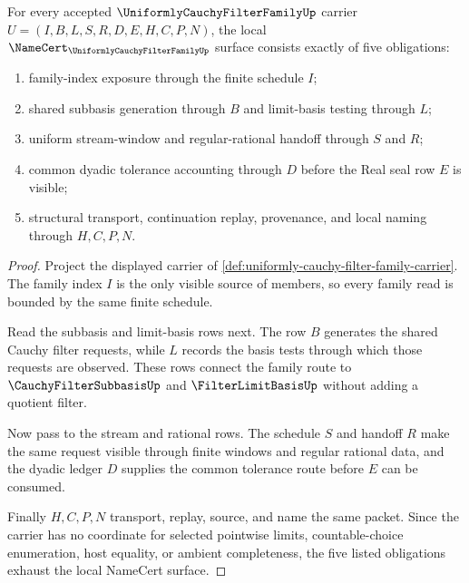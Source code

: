 \begin{theorem}
\label{thm:uniformly-cauchy-filter-family-obligations}
For every accepted $\UniformlyCauchyFilterFamilyUp$ carrier $U=(I,B,L,S,R,D,E,H,C,P,N)$, the local $\NameCert_{\UniformlyCauchyFilterFamilyUp}$ surface consists exactly of five obligations:
\begin{enumerate}
\item family-index exposure through the finite schedule $I$;
\item shared subbasis generation through $B$ and limit-basis testing through $L$;
\item uniform stream-window and regular-rational handoff through $S$ and $R$;
\item common dyadic tolerance accounting through $D$ before the Real seal row $E$ is visible;
\item structural transport, continuation replay, provenance, and local naming through $H,C,P,N$.
\end{enumerate}
\end{theorem}
\begin{proof}
Project the displayed carrier of \autoref{def:uniformly-cauchy-filter-family-carrier}. The family index $I$ is the only visible source of members, so every family read is bounded by the same finite schedule.

Read the subbasis and limit-basis rows next. The row $B$ generates the shared Cauchy filter requests, while $L$ records the basis tests through which those requests are observed. These rows connect the family route to $\CauchyFilterSubbasisUp$ and $\FilterLimitBasisUp$ without adding a quotient filter.

Now pass to the stream and rational rows. The schedule $S$ and handoff $R$ make the same request visible through finite windows and regular rational data, and the dyadic ledger $D$ supplies the common tolerance route before $E$ can be consumed.

Finally $H,C,P,N$ transport, replay, source, and name the same packet. Since the carrier has no coordinate for selected pointwise limits, countable-choice enumeration, host equality, or ambient completeness, the five listed obligations exhaust the local NameCert surface.
\end{proof}


